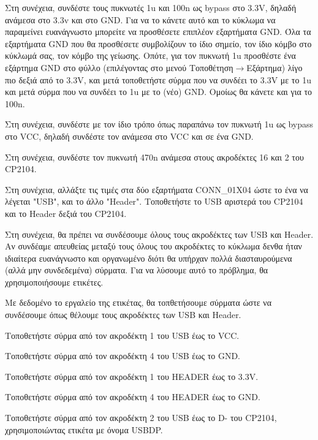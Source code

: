 \documentclass[a4paper]{article}
\begin{document}
Στη συνέχεια, συνδέστε τους πυκνωτές 1u και 100n ως bypass στο 3.3V, δηλαδή ανάμεσα στο 3.3v και στο GND. Για να το κάνετε αυτό και το κύκλωμα να παραμείνει ευανάγνωστο μπορείτε να προσθέσετε επιπλέον εξαρτήματα GND. Όλα τα εξαρτήματα GND που θα προσθέσετε συμβολίζουν το ίδιο σημείο, τον ίδιο κόμβο στο κύκλωμά σας, τον κόμβο της γείωσης. Οπότε, για τον πυκνωτή 1u προσθέστε ένα εξάρτημα GND στο φύλλο (επιλέγοντας στο μενού Τοποθέτηση$\rightarrow$Εξάρτημα) λίγο πιο δεξιά από το 3.3V, και μετά τοποθετήστε σύρμα που να συνδέει το 3.3V με το 1u και μετά σύρμα που να συνδέει το 1u με το (νέο) GND. Ομοίως θα κάνετε και για το 100n.

Στη συνέχεια, συνδέστε με τον ίδιο τρόπο όπως παραπάνω τον πυκνωτή 1u ως bypass στο VCC, δηλαδή συνδέστε τον ανάμεσα στο VCC και σε ένα GND.

Στη συνέχεια, συνδέστε τον πυκνωτή 470n ανάμεσα στους ακροδέκτες 16 και 2 του CP2104.

Στη συνέχεια, αλλάξτε τις τιμές στα δύο εξαρτήματα CONN\_01X04 ώστε το ένα να λέγεται "USB", και το άλλο "Header". Τοποθετήστε το USB αριστερά του CP2104 και το Header δεξιά του CP2104.

\begin{figure}
  \begin{center}
    \label{fig:kicad-main}
  \end{center}
\end{figure}

Στη συνέχεια, θα πρέπει να συνδέσουμε όλους τους ακροδέκτες των USB και Header. Αν συνδέαμε απευθείας μεταξύ τους όλους του ακροδέκτες το κύκλωμα δενθα ήταν ιδιαίτερα ευανάγνωστο και οργανωμένο διότι θα υπήρχαν πολλά διασταυρούμενα (αλλά μην συνδεδεμένα) σύρματα. Για να λύσουμε αυτό το πρόβλημα, θα χρησιμοποιήσουμε ετικέτες.

Με δεδομένο το εργαλείο της ετικέτας, θα τοπθετήσουμε σύρματα ώστε να συνδέσουμε όπως θέλουμε τους ακροδέκτες των USB και Header.

Τοποθετήστε σύρμα από τον ακροδέκτη 1 του USB έως το VCC.

Τοποθετήστε σύρμα από τον ακροδέκτη 4 του USB έως το GND.

Τοποθετήστε σύρμα από τον ακροδέκτη 1 του HEADER έως το 3.3V.

Τοποθετήστε σύρμα από τον ακροδέκτη 4 του HEADER έως το GND.

Τοποθετήστε σύρμα από τον ακροδέκτη 2 του USB έως το D- του CP2104, χρησιμοποιώντας ετικέτα με όνομα USBDP. 
\end{document}
